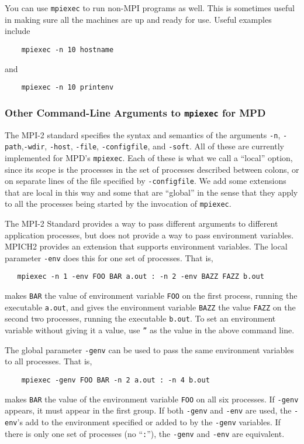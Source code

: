 \documentclass[dvipdfm,11pt]{article}
\begin{document}
You can use \texttt{mpiexec} to run non-MPI programs as well.  This is
sometimes useful in making sure all the machines are up and ready for
use.  Useful examples include
\begin{verbatim}
    mpiexec -n 10 hostname
\end{verbatim}
and
\begin{verbatim}
    mpiexec -n 10 printenv
\end{verbatim}


\subsubsection{Other Command-Line Arguments to \texttt{mpiexec} for MPD}
\label{sec:environment}

The MPI-2 standard specifies the syntax and semantics of the arguments
\texttt{-n}, \texttt{-path},\texttt{-wdir}, \texttt{-host},
\texttt{-file}, \texttt{-configfile}, and \texttt{-soft}.  All of these
are currently implemented for MPD's \texttt{mpiexec}.
Each of these is what we call a ``local'' option, since
its scope is the processes in the set of processes described between
colons, or on separate lines of the file specified by
\texttt{-configfile}.  We add some extensions that are local in this way
and some that are ``global'' in the sense that they apply to all the
processes being started by the invocation of \texttt{mpiexec}.

The MPI-2 Standard provides a way to pass different arguments to different
application processes, but does not provide a way to pass environment
variables.  MPICH2 provides an extension that supports environment
variables.
The local parameter \texttt{-env} does this for one set of
processes.  That is,
\begin{verbatim}
   mpiexec -n 1 -env FOO BAR a.out : -n 2 -env BAZZ FAZZ b.out
\end{verbatim}
makes \texttt{BAR} the value of environment variable \texttt{FOO} on the
first process, running the executable \texttt{a.out}, and gives the
environment variable \texttt{BAZZ} the value \texttt{FAZZ} on the second
two processes, running the executable \texttt{b.out}.  To set an
environment variable without giving it a value, use \texttt{''} as the
value in the above command line.

The global parameter \texttt{-genv} can be used to pass the same
environment variables to all processes.  That is,
\begin{verbatim}
    mpiexec -genv FOO BAR -n 2 a.out : -n 4 b.out
\end{verbatim}
makes \texttt{BAR} the value of the environment variable \texttt{FOO} on
all six processes.  If \texttt{-genv} appears, it must appear in the
first group.  If both \texttt{-genv} and \texttt{-env} are used, the
\texttt{-env}'s add to the environment specified or added to by the
\texttt{-genv} variables.  If there is only one set of processes (no
``\texttt{:}''), the \texttt{-genv} and \texttt{-env} are equivalent.
\end{document}
